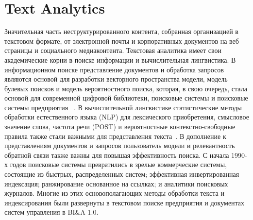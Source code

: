 \section{Text Analytics}

Значительная часть неструктурированного контента, собранная
организацией в текстовом формате, от электронной почты
и корпоративных документов на веб-страницы и социального
медиаконтента. Текстовая аналитика имеет свои академические корни в поиске информации и вычислительная лингвистика. В информационном
поиске представление документов и обработка запросов
являются основой для разработки векторного пространства
модели, модель булевых поисков и модель вероятностного поиска, которая, в свою очередь, стала основой для современной цифровой
библиотеки, поисковые системы и поисковые системы предприятия
~\cite{Salton:1989}. В вычислительной лингвистике статистические 
методы обработки естественного языка (NLP) для лексического приобретения,
смысловое значение слова, частота речи (POST)
и вероятностные контекстно-свободные правила также стали
важными для представления текста~\cite{Manning:1999}.
В дополнение к представлениям документов и запросов пользователь
модели и релевантность обратной связи также важны для
повышая эффективность поиска.
С начала 1990-х годов поисковые системы превратились в
зрелые коммерческие системы, состоящие из быстрых, распределенных
систем; эффективная инвертированная индексация; ранжирование основанное на ссылках; и аналитики поисковых журналов. Многие из этих основополагающих
методы обработки текста и индексирования были
развернуты в текстовом поиске предприятия и документах
систем управления в BI\&A 1.0.

